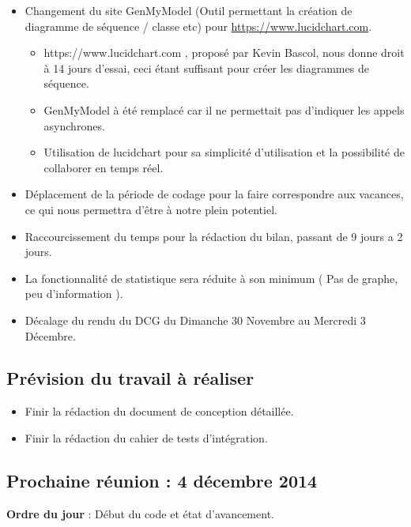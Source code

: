 \documentclass[12pt,a4paper]{article}
\begin{document}
\begin{itemize}[label = $\ast$]
	\item Changement du site GenMyModel (Outil permettant la création de diagramme de séquence / classe etc)  pour \url{https://www.lucidchart.com}.
	\begin{itemize}[label = $\circ$]
		\item https://www.lucidchart.com , proposé par Kevin Bascol, nous donne droit à 14 jours d'essai, ceci étant suffisant pour créer les diagrammes de séquence.
		\item GenMyModel à été remplacé car il ne permettait pas d'indiquer les appels asynchrones.
		\item Utilisation de lucidchart pour sa simplicité d'utilisation et la possibilité de collaborer en temps réel.
	\end{itemize}
	\item Déplacement de la période de codage pour la faire correspondre aux vacances, ce qui nous permettra d'être à notre plein potentiel.
	\item Raccourcissement du temps pour la rédaction du bilan, passant de 9 jours a 2 jours.
	\item La fonctionnalité de statistique sera réduite à son minimum ( Pas de graphe, peu d'information ).
	\item Décalage du rendu du DCG du Dimanche 30 Novembre au Mercredi 3 Décembre.
\end{itemize}

\subsection*{Prévision du travail à réaliser}

\begin{itemize}[label = $\ast$]
	\item Finir la rédaction du document de conception détaillée.
	\item Finir la rédaction du cahier de tests d'intégration.
\end{itemize}

\subsection*{Prochaine réunion : 4 décembre 2014}

\textbf{Ordre du jour} : Début du code et état d'avancement.\\
\end{document}
